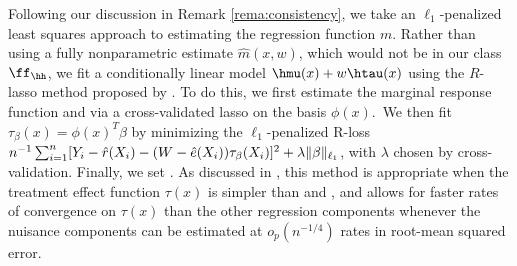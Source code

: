 \documentclass[aos,submission]{imsart}
\theoremstyle{plain}
\theoremstyle{remark}
\DeclarePairedDelimiter\norm{\lVert}{\rVert}
\begin{document}
Following our discussion in Remark \ref{rema:consistency}, we take
an $\ell_1$-penalized least squares approach to estimating the regression function $m$.
Rather than using a fully nonparametric estimate $\hat m(x,w)$,
which would not be in our class $\ff_{\hh}$, 
we fit a conditionally linear model $\hmu(x) + w\htau(x)$
using the $R$-lasso method proposed by \citet{nie2017learning}.
To do this, we first estimate the marginal response function  and 
via a cross-validated lasso \citep{tibshirani1996regression}
on the basis $\phi(x)$.\footnotemark\ We then fit $\tau_{\beta}(x)= \phi(x)^T\beta$ 
by minimizing the $\ell_1$-penalized R-loss
$n^{-1}\sum_{i=1}^n [Y_i - \hat r(X_i) - (W-\hat e(X_i))\tau_{\beta}(X_i)]^2 + \lambda\norm{\beta}_{\ell_1}$,
with $\lambda$ chosen by cross-validation.
Finally, we set .
As discussed in \citet{nie2017learning}, this method is appropriate when the treatment effect function $\tau(x)$
is simpler than  and ,
and allows for faster rates of convergence on $\tau(x)$ than the other regression components
whenever the nuisance components can be estimated at $o_p(n^{-1/4})$ rates in root-mean squared error.

\end{document}
